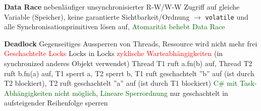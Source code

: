 \textbf{Data Race} nebenläufiger unsynchronisierter R-W/W-W Zugriff auf gleiche Variable (Speicher), keine garantierte Sichtbarkeit/Ordnung $\rightarrow$ \lstinline{volatile} und alle Synchronisationprimitiven lösen auf, \textcolor{darkGreen}{Atomarität behebt Data Race}

\textbf{Deadlock} Gegenseitiges Aussperren von Threads, Ressource wird nicht mehr frei \textcolor{red}{Geschachtelte Locks} Locks in Locks \textcolor{red}{zyklische Warteabhängigkeiten} (in synchronized anderes Objekt verwendet) Thread T1 ruft a.fn(b) auf, Thread T2 ruft b.fn(a) auf, T1 sperrt a, T2 sperrt b, T1 ruft geschachtelt ''b'' auf (ist durch T2 blockiert), T2 ruft geschachtelt ''a'' auf (ist durch T1 blockiert) \textcolor{darkGreen}{C\# mit Task-Abhängigkeiten nicht möglich}, \textcolor{darkGreen}{Lineare Sperrordnung} nur geschachtelt in aufsteigender Reihenfolge sperren

